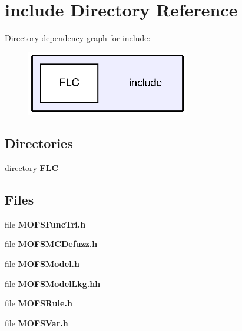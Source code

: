 \section{include Directory Reference}
\label{dir_d44c64559bbebec7f509842c48db8b23}
Directory dependency graph for include\-:\nopagebreak
\begin{figure}[H]
\begin{center}
\leavevmode
\includegraphics[width=202pt]{dir_d44c64559bbebec7f509842c48db8b23_dep}
\end{center}
\end{figure}
\subsection*{Directories}
\begin{DoxyCompactItemize}
\item 
directory {\bf F\-L\-C}
\end{DoxyCompactItemize}
\subsection*{Files}
\begin{DoxyCompactItemize}
\item 
file {\bf M\-O\-F\-S\-Func\-Tri.\-h}
\item 
file {\bf M\-O\-F\-S\-M\-C\-Defuzz.\-h}
\item 
file {\bf M\-O\-F\-S\-Model.\-h}
\item 
file {\bf M\-O\-F\-S\-Model\-Lkg.\-hh}
\item 
file {\bf M\-O\-F\-S\-Rule.\-h}
\item 
file {\bf M\-O\-F\-S\-Var.\-h}
\end{DoxyCompactItemize}
